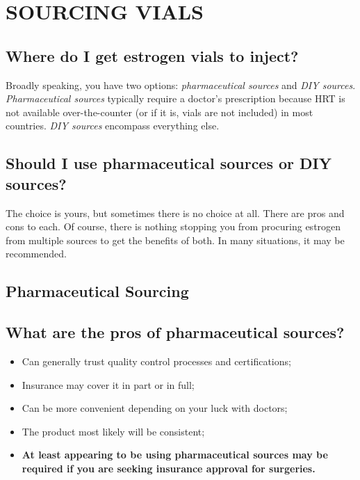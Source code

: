 \documentclass{article}
\begin{document}
\section{SOURCING VIALS}\label{sv}

\subsection{Where do I get estrogen vials to inject?}

Broadly speaking, you have two options: \textit{pharmaceutical sources} and \textit{DIY sources}. \textit{Pharmaceutical sources} typically require a doctor's prescription because HRT is not available over-the-counter (or if it is, vials are not included) in most countries. \textit{DIY sources} encompass everything else.

\subsection{Should I use pharmaceutical sources or DIY sources?}

The choice is yours, but sometimes there is no choice at all. There are pros and cons to each. Of course, there is nothing stopping you from procuring estrogen from multiple sources to get the benefits of both. In many situations, it may be recommended.

\subsection*{Pharmaceutical Sourcing}

\subsection{What are the pros of pharmaceutical sources?}

\begin{itemize}
  \item Can generally trust quality control processes and certifications;
  \item Insurance may cover it in part or in full;
  \item Can be more convenient depending on your luck with doctors;
  \item The product most likely will be consistent;
  \item \textbf{At least appearing to be using pharmaceutical sources may be required if you are seeking insurance approval for surgeries.}
\end{itemize}
\end{document}
